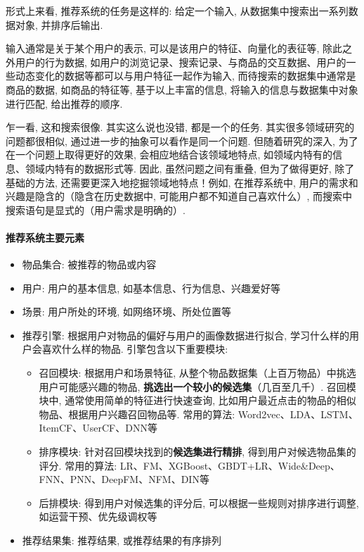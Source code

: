 形式上来看, 推荐系统的任务是这样的: 给定一个输入, 从数据集中搜索出一系列数据对象, 并排序后输出. 

输入通常是关于某个用户的表示, 可以是该用户的特征、向量化的表征等, 除此之外用户的行为数据, 如用户的浏览记录、搜索记录、与商品的交互数据、用户的一些动态变化的数据等都可以与用户特征一起作为输入, 而待搜索的数据集中通常是商品的数据, 如商品的特征等, 基于以上丰富的信息, 将输入的信息与数据集中对象进行匹配, 给出推荐的顺序. 

乍一看, 这和搜索很像. 其实这么说也没错, 都是一个的任务. 其实很多领域研究的问题都很相似, 通过进一步的抽象可以看作是同一个问题. 但随着研究的深入, 为了在一个问题上取得更好的效果, 会相应地结合该领域地特点, 如领域内特有的信息、领域内特有的数据形式等. 因此, 虽然问题之间有重叠, 但为了做得更好, 除了基础的方法, 还需要更深入地挖掘领域地特点！例如, 在推荐系统中, 用户的需求和兴趣是隐含的（隐含在历史数据中, 可能用户都不知道自己喜欢什么）, 而搜索中搜索语句是显式的（用户需求是明确的）. 

\paragraph{推荐系统主要元素}
\begin{itemize}
	\item 物品集合: 被推荐的物品或内容
	\item 用户: 用户的基本信息, 如基本信息、行为信息、兴趣爱好等
	\item 场景: 用户所处的环境, 如网络环境、所处位置等
	\item 推荐引擎: 根据用户对物品的偏好与用户的画像数据进行拟合, 学习什么样的用户会喜欢什么样的物品. 引擎包含以下重要模块: 
	\begin{itemize}
		\item 召回模块: 根据用户和场景特征, 从整个物品数据集（上百万物品）中挑选用户可能感兴趣的物品, \textbf{挑选出一个较小的候选集}（几百至几千）. 召回模块中, 通常使用简单的特征进行快速查询, 比如用户最近点击的物品的相似物品、根据用户兴趣召回物品等. 常用的算法: Word2vec、LDA、LSTM、ItemCF、UserCF、DNN等
		\item 排序模块: 针对召回模块找到的\textbf{候选集进行精排}, 得到用户对候选物品集的评分. 常用的算法: LR、FM、XGBoost、GBDT+LR、Wide\&Deep、FNN、PNN、DeepFM、NFM、DIN等
		\item 后排模块: 得到用户对候选集的评分后, 可以根据一些规则对排序进行调整, 如运营干预、优先级调权等
	\end{itemize}
	\item 推荐结果集: 推荐结果, 或推荐结果的有序排列
\end{itemize}

